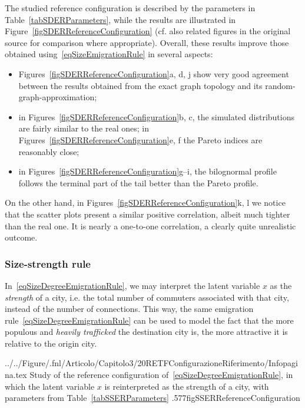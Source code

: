 \documentclass[a4paper]{article}
\begin{document}
The studied reference configuration is described by the parameters in Table~\ref{tabSDERParameters}, while the results are illustrated in Figure~\ref{figSDERReferenceConfiguration} (cf. also related figures in the original source for comparison where appropriate). Overall, these results improve those obtained using~\eqref{eqSizeEmigrationRule} in several aspects:
\begin{itemize}
\item Figures~\ref{figSDERReferenceConfiguration}a, d, j show very good agreement between the results obtained from the exact graph topology and its random-graph-approximation;
\item in Figures~\ref{figSDERReferenceConfiguration}b, c, the simulated distributions are fairly similar to the real ones; in Figures~\ref{figSDERReferenceConfiguration}e, f the Pareto indices are reasonably close;
\item in Figures~\ref{figSDERReferenceConfiguration}g--i, the bilognormal profile follows the terminal part of the tail better than the Pareto profile.
\end{itemize}

On the other hand, in Figures~\ref{figSDERReferenceConfiguration}k, l we notice that the scatter plots present a similar positive correlation, albeit much tighter than the real one. It is nearly a one-to-one correlation, a clearly quite unrealistic outcome.

\subsubsection{Size-strength rule}
\label{secSSER}
%
In~\eqref{eqSizeDegreeEmigrationRule}, we may interpret the latent variable $x$ as the \textit{strength} of a city, i.e. the total number of commuters associated with that city, instead of the number of connections. This way, the same emigration rule~\eqref{eqSizeDegreeEmigrationRule} can be used to model the fact that the more populous and \textit{heavily trafficked} the destination city is, the more attractive it is relative to the origin city.

  {../../Figure/.fnl/Articolo/Capitolo3/20RETFConfigurazioneRiferimento/Infopagina.tex}
  {Study of the reference configuration of~\ref{eqSizeDegreeEmigrationRule}, in which the latent variable $x$ is reinterpreted as the strength of a city, with parameters from Table~\ref{tabSSERParameters}}
  {.577\linewidth}{figSSERReferenceConfiguration}
\end{document}

